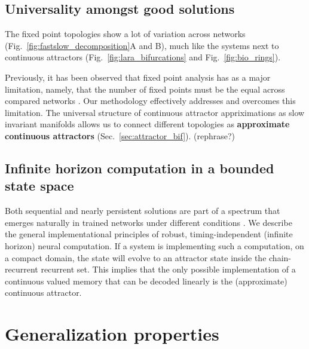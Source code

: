 \documentclass{article} %
\newcommand{\mpcomment}[1]{\textcolor{mpcolor}{(#1)}}
\newcounter{ct}
\theoremstyle{definition}
\theoremstyle{remark}
\begin{document}
\subsection{Universality amongst good solutions}


The fixed point topologies show a lot of variation across networks (Fig.~\ref{fig:fastslow_decomposition}A and B),
 much like the systems next to continuous attractors (Fig.~\ref{fig:lara_bifurcations} and Fig.~\ref{fig:bio_rings}).

 
 Previously, it has been observed that  fixed point analysis  has as a major limitation, namely, that the number of fixed points must be the equal across compared networks  \citep{maheswaranathan2019universality}.
Our methodology effectively addresses and overcomes this limitation.
The universal structure of continuous attractor appriximations as slow invariant manifolds allows us to connect different topologies as \textbf{approximate continuous attractors} (Sec.~\ref{sec:attractor_bif}). \mpcomment{rephrase?}



\subsection{Infinite horizon computation in a bounded state space}\label{sec:inhoco}

Both sequential and nearly persistent solutions are part of a spectrum that emerges naturally in trained networks under different conditions \citep{orhan2019diverse}.
We describe the general implementational principles of robust, timing-independent (infinite horizon) neural computation.
If a system is implementing such a computation, on a compact domain, the state will evolve to an attractor state inside the chain-recurrent recurrent set.
This implies that the only possible implementation of a continuous valued memory that can be decoded linearly is the (approximate) continuous attractor.






\section{Generalization properties}
\end{document}
